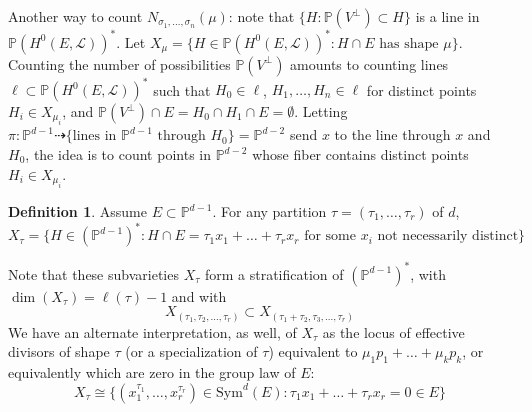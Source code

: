 \documentclass[11pt]{article}           %
\renewcommand{\P}{\mathbb P}
\theoremstyle{definition}
\newtheorem{dfn}[thm]{Definition}
\begin{document}
Another way to count $N_{\sigma_1,\dots,\sigma_n}(\mu)$: note that $\{H:\P(V^{\perp})\subset H\}$ is a line in $\P(H^0(E,\mathcal L))^*$.
Let $X_{\mu}=\{H\in\P(H^0(E,\mathcal L))^*:H\cap E\text{ has shape }\mu\}$.
Counting the number of possibilities $\P(V^{\perp})$ amounts to counting lines $\ell\subset\P(H^0(E,\mathcal L))^*$ such that $H_0\in\ell$, $H_1,\dots,H_{n}\in\ell$ for distinct points $H_i\in X_{\mu_i}$, and $\P(V^{\perp})\cap E=H_0\cap H_1\cap E=\emptyset$.
Letting $\pi:\P^{d-1}\dashrightarrow \{\text{lines in $\P^{d-1}$ through $H_0$}\}=\P^{d-2}$ send $x$ to the line through $x$ and $H_0$, the idea is to count points in $\P^{d-2}$ whose fiber contains distinct points $H_i\in X_{\mu_i}$.

\begin{dfn}
  Assume $E\subset \P^{d-1}$. For any partition $\tau=(\tau_1,\dots,\tau_r)$ of $d$,
  \[
  X_{\tau}=\{H\in (\P^{d-1})^*:H\cap E=\tau_1x_1+\dots+\tau_rx_r\text{ for some }x_i\text{ not necessarily distinct}\}
  \]
\end{dfn}

Note that these subvarieties $X_{\tau}$ form a stratification of $(\P^{d-1})^*$,
with $\dim(X_{\tau})=\ell(\tau)-1$ and with
\[
X_{(\tau_1,\tau_2,\dots,\tau_r)}\subset X_{(\tau_1+\tau_2,\tau_3,\dots,\tau_r)}
\]
We have an alternate interpretation, as well, of $X_{\tau}$ as the locus of effective divisors of shape $\tau$ (or a specialization of $\tau$) equivalent to $\mu_1p_1+\dots+\mu_kp_k$, or equivalently which are zero in the group law of $E$:
\[
X_{\tau}\cong\{(x_1^{\tau_1},\dots,x_r^{\tau_r})\in\text{Sym}^d(E):\tau_1x_1+\dots+\tau_rx_r=0\in E\}
\]
\end{document}
